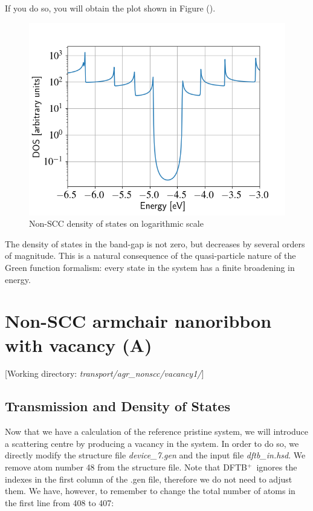 \documentclass[a4paper,11pt,english]{sphinxmanual}
\newcommand{\dftbp}{\textsf{DFTB$^{\text{+}}$\ }} %
\begin{document}
{{If you do so, you will obtain the plot shown in Figure
{\hyperref[transport:fig-nonscc-dos-semilogy]{\emph{}}} ().
\begin{figure}[htbp]
\centering
\capstart
\includegraphics[width=0.700\linewidth]{nonscc-dos-semilog.png}
\caption{Non-SCC density of states on logarithmic scale}\label{transport:fig-nonscc-dos-semilogy}\end{figure}

The density of states in the band-gap is not zero, but decreases by
several orders of magnitude. This is a natural consequence of the
quasi-particle nature of the Green function formalism: every state
in the system has a finite broadening in energy.


\section{Non-SCC armchair nanoribbon with vacancy (A)}
\label{transport:non-scc-armchair-nanoribbon-with-vacancy-a}
{[}Working directory: \emph{transport/agr\_nonscc/vacancy1/}{]}


\subsection{Transmission and Density of States}
\label{transport:id1}
Now that we have a calculation of the reference pristine system, we
will introduce a scattering centre by producing a vacancy in the
system. In order to do so, we directly modify the structure file
\emph{device\_7.gen} and the input file \emph{dftb\_in.hsd}. We remove atom number
48 from the structure file. Note that \dftbp ignores the indexes in
the first column of the .gen file, therefore we do not need to adjust
them. We have, however, to remember to change the total number of
atoms in the first line from 408 to 407:

}}
\end{document}
